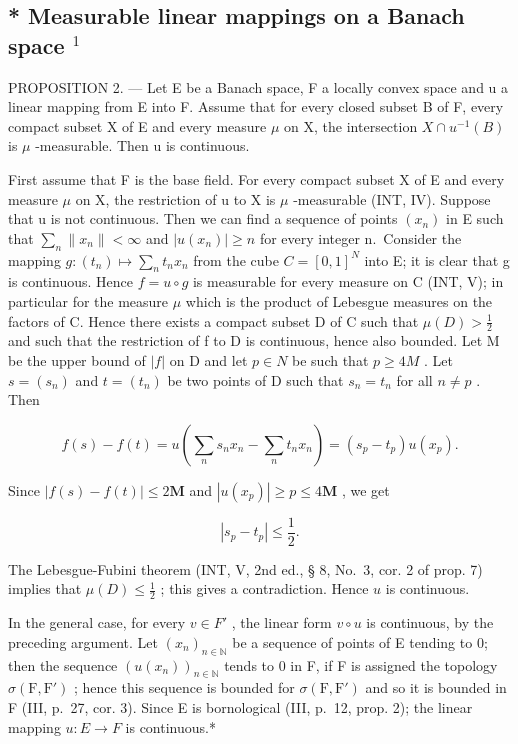 \subsection{\texorpdfstring{* Measurable linear mappings on a Banach space \(^{1}\)}{Measurable linear mappings on a Banach space \^{}\{1\}}}

PROPOSITION 2. --- Let E be a Banach space, F a locally convex space and u a linear mapping from E into F. Assume that for every closed subset B of F, every compact subset X of E and every measure \(\mu\) on X, the intersection \(X \cap u^{-1}(B)\) is \(\mu\) -measurable. Then u is continuous.

First assume that F is the base field. For every compact subset X of E and every measure \(\mu\) on X, the restriction of u to X is \(\mu\) -measurable (INT, IV). Suppose that u is not continuous. Then we can find a sequence of points \((x_{n})\) in E such that \(\sum_{n} \|x_{n}\| < \infty\) and \(|u(x_{n})| \geqslant n\) for every integer n.~Consider the mapping \(g:(t_{n}) \mapsto \sum_{n} t_{n} x_{n}\) from the cube \(C = [0, 1]^{N}\) into E; it is clear that g is continuous. Hence \(f = u \circ g\) is measurable for every measure on C (INT, V); in particular for the measure \(\mu\) which is the product of Lebesgue measures on the factors of C. Hence there exists a compact subset D of C such that \(\mu(D) > \frac{1}{2}\) and such that the restriction of f to D is continuous, hence also bounded. Let M be the upper bound of \(|f|\) on D and let \(p \in N\) be such that \(p \geqslant 4M\) . Let \(s = (s_{n})\) and \(t = (t_{n})\) be two points of D such that \(s_{n} = t_{n}\) for all \(n \neq p\) . Then

\[
f (s) - f (t) = u (\sum_ {n} s _ {n} x _ {n} - \sum_ {n} t _ {n} x _ {n}) = (s _ {p} - t _ {p}) u (x _ {p}).
\]

Since \(|f(s) - f(t)| \leqslant 2\mathbf{M}\) and \(|u(x_p)| \geqslant p \leqslant 4\mathbf{M}\) , we get

\[
\left| s _ {p} - t _ {p} \right| \leqslant \frac {1}{2}.
\]

The Lebesgue-Fubini theorem (INT, V, 2nd ed., § 8, No.~3, cor. 2 of prop. 7) implies that \(\mu(D) \leqslant \frac{1}{2}\) ; this gives a contradiction. Hence \(u\) is continuous.

In the general case, for every \(v \in F'\) , the linear form \(v \circ u\) is continuous, by the preceding argument. Let \((x_{n})_{n \in \mathbb{N}}\) be a sequence of points of E tending to 0; then the sequence \((u(x_{n}))_{n \in \mathbb{N}}\) tends to 0 in F, if F is assigned the topology \(\sigma(\mathrm{F}, \mathrm{F}')\) ; hence this sequence is bounded for \(\sigma(\mathrm{F}, \mathrm{F}')\) and so it is bounded in F (III, p.~27, cor. 3). Since E is bornological (III, p.~12, prop. 2); the linear mapping \(u: E \to F\) is continuous.*


